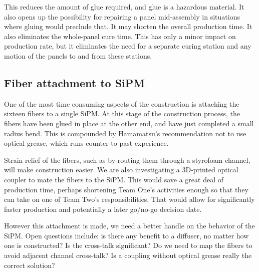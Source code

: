This reduces the amount of glue required, and glue is a hazardous material. It also opens up the possibility for repairing a panel mid-assembly in situations where gluing would preclude that. It may shorten the overall production time. It also eliminates the whole-panel cure time. This has only a minor impact on production rate, but it eliminates the need for a separate curing station and any motion of the panels to and from these stations.

\subsection{Fiber attachment to SiPM}

One of the most time consuming aspects of the construction is attaching the sixteen fibers to a single SiPM. At this stage of the construction process, the fibers have been glued in place at the other end, and have just completed a small radius bend. This is compounded by Hamamatsu's recommendation not to use optical grease, which runs counter to past experience. 

Strain relief of the fibers, such as by routing them through a styrofoam channel, will make construction easier. We are also investigating a 3D-printed optical coupler to mate the fibers to the SiPM. This would save a great deal of production time, perhaps shortening Team One's activities enough so that they can take on one of Team Two's responsibilities. That would allow for significantly faster production and potentially a later go/no-go decision date.

However this attachment is made, we need a better handle on the behavior of the SiPM. Open questions include: is there any benefit to a diffuser, no matter how one is constructed? Is the cross-talk significant? Do we need to map the fibers to avoid adjacent channel cross-talk? Is a coupling without optical grease really the correct solution?


